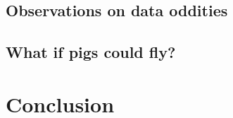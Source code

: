 \documentclass[12pt,a4paper]{article}
\begin{document}
\subsection{Observations on data oddities}
\label{sec:results-oddities}

\FloatBarrier

\subsection{What if pigs could fly?} %

\section{Conclusion}

%
\end{document}
